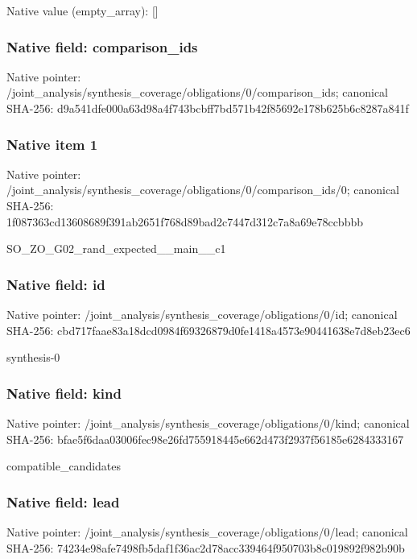 \documentclass[10pt,a4paper]{article}
\begin{document}
Native value (empty\_\allowbreak{}array): []

\subsubsection{Native field: comparison\_\allowbreak{}ids}
Native pointer: /joint\_\allowbreak{}analysis/synthesis\_\allowbreak{}coverage/obligations/0/comparison\_\allowbreak{}ids; canonical SHA-256: d9a541dfe000a63d98a4f743bcbff7bd571b42f85692e178b625b6c8287a841f

\subsubsection{Native item 1}
Native pointer: /joint\_\allowbreak{}analysis/synthesis\_\allowbreak{}coverage/obligations/0/comparison\_\allowbreak{}ids/0; canonical SHA-256: 1f087363cd13608689f391ab2651f768d89bad2c7447d312c7a8a69e78ccbbbb

\begingroup\raggedright\sloppy SO\_\allowbreak{}ZO\_\allowbreak{}G02\_\allowbreak{}rand\_\allowbreak{}expected\_\allowbreak{}\_\allowbreak{}main\_\allowbreak{}\_\allowbreak{}c1\par\endgroup

\subsubsection{Native field: id}
Native pointer: /joint\_\allowbreak{}analysis/synthesis\_\allowbreak{}coverage/obligations/0/id; canonical SHA-256: cbd717faae83a18dcd0984f69326879d0fe1418a4573e90441638e7d8eb23ec6

\begingroup\raggedright\sloppy synthesis-0\par\endgroup

\subsubsection{Native field: kind}
Native pointer: /joint\_\allowbreak{}analysis/synthesis\_\allowbreak{}coverage/obligations/0/kind; canonical SHA-256: bfae5f6daa03006fec98e26fd755918445e662d473f2937f56185e6284333167

\begingroup\raggedright\sloppy compatible\_\allowbreak{}candidates\par\endgroup

\subsubsection{Native field: lead}
Native pointer: /joint\_\allowbreak{}analysis/synthesis\_\allowbreak{}coverage/obligations/0/lead; canonical SHA-256: 74234e98afe7498fb5daf1f36ac2d78acc339464f950703b8c019892f982b90b
\end{document}

